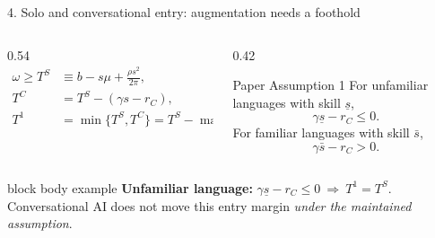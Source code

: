 \documentclass[aspectratio=169,10pt]{beamer}
\begin{document}
\begin{frame}{4. Solo and conversational entry: augmentation needs a foothold}
  \begin{columns}[T,onlytextwidth]
    \begin{column}{0.54\textwidth}
      \begin{align*}
        \omega\ge T^S
        &\equiv b-s\mu+\frac{\rho s^2}{2\pi},\\[0.15cm]
        T^C
        &=T^S-(\gamma s-r_C),\\[0.15cm]
        T^1
        &=\min\{T^S,T^C\}
          =T^S-\max\{0,\gamma s-r_C\}.
      \end{align*}
    \end{column}
    \begin{column}{0.42\textwidth}
      \begin{alertblock}{Paper Assumption 1}
        For unfamiliar languages with skill $\underline{s}$,
        \[
          \gamma\underline{s}-r_C\le 0.
        \]
        For familiar languages with skill $\bar{s}$,
        \[
          \gamma\bar{s}-r_C>0.
        \]
      \end{alertblock}
    \end{column}
  \end{columns}

  \vspace{0.16cm}
  \begin{beamercolorbox}[wd=\textwidth,sep=0.19cm,rounded=true]{block body example}
    \centering
    \textbf{Unfamiliar language:}\quad
    $\gamma\underline{s}-r_C\le 0\ \Longrightarrow\ T^1=T^S$.\quad
    Conversational AI does not move this entry margin \emph{under the maintained assumption}.
  \end{beamercolorbox}
\end{frame}
\end{document}
